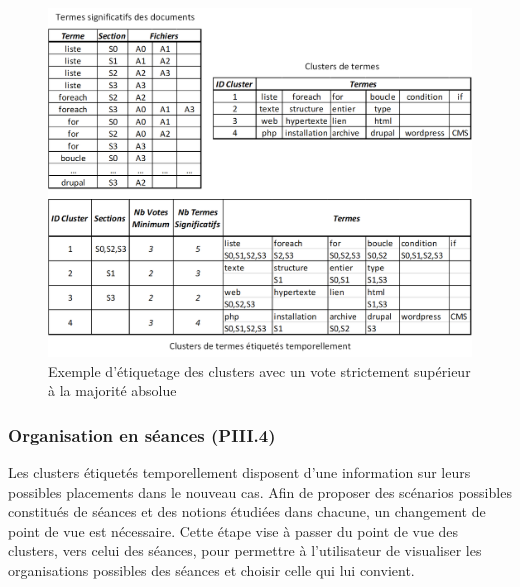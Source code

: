\begin{figure}[ht!]
\centering
\centerline{  %
\includegraphics[scale=1]{5-Conclusion/images/3-analyse-temporelle/exemple_fusion_clusters_termes_significatifs.png}
}
\caption{Exemple d'étiquetage des clusters avec un vote strictement supérieur à la majorité absolue}
\label{figure:5-III-3-ExempleFusionClustersTermesSignificatifs}
\end{figure}

\vfill
\hspace{0pt}

\newpage

\subsubsection{Organisation en séances (PIII.4)}
\label{subsubsection:Conclusion:PerspectivesAmeliorations:AnalyseTemporelle:OrganisationSeances}

Les clusters étiquetés temporellement disposent d'une information sur leurs possibles placements dans le nouveau cas.
Afin de proposer des scénarios possibles constitués de séances et des notions étudiées dans chacune, un changement de point de vue est nécessaire.
Cette étape vise à passer du point de vue des clusters, vers celui des séances, pour permettre à l'utilisateur de visualiser les organisations possibles des séances et choisir celle qui lui convient.

\bigskip


